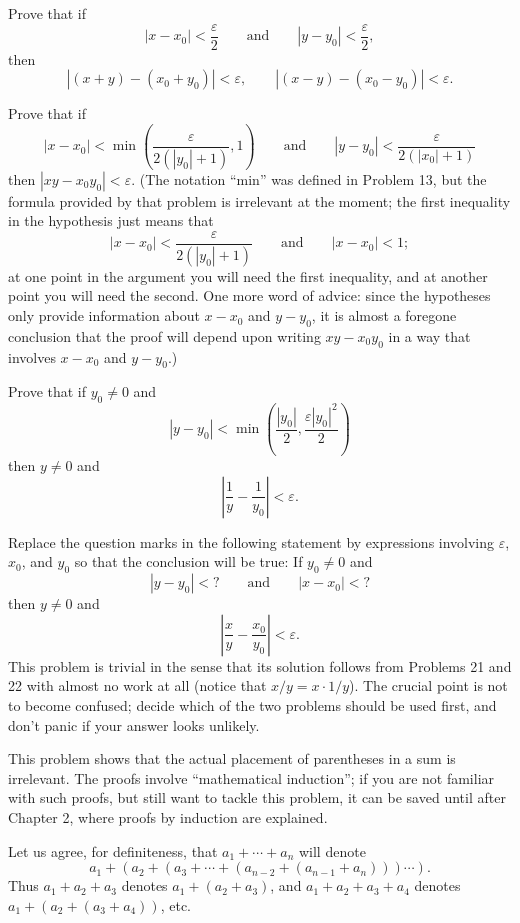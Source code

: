  Prove that if
\[
|x - x_0| < \frac{\varepsilon}{2}
\qquad\text{and}\qquad
|y - y_0| < \frac{\varepsilon}{2},
\]
then
\[
|(x+y) - (x_0+y_0)| < \varepsilon,
\qquad
|(x-y) - (x_0-y_0)| < \varepsilon.
\]

 Prove that if
\[
|x - x_0| < \min\left(\frac{\varepsilon}{2(|y_0|+1)}, 1\right)
\qquad\text{and}\qquad
|y - y_0| < \frac{\varepsilon}{2(|x_0|+1)}
\]
then $|xy - x_0y_0| < \varepsilon$.
(The notation ``min'' was defined in Problem 13, but the formula provided by
that problem is irrelevant at the moment; the first inequality in the
hypothesis just means that
\[
|x - x_0| < \frac{\varepsilon}{2(|y_0|+1)}
\qquad\text{and}\qquad
|x - x_0| < 1;
\]
at one point in the argument you will need the first inequality, and at
another point you will need the second. One more word of advice: since the
hypotheses only provide information about $x - x_0$ and $y - y_0$, it is
almost a foregone conclusion that the proof will depend upon writing
$xy - x_0y_0$ in a way that involves $x - x_0$ and $y - y_0$.)

 Prove that if $y_0 \neq 0$ and
\[
|y - y_0| < \min\left(\frac{|y_0|}{2}, \frac{\varepsilon |y_0|^2}{2}\right)
\]
then $y \neq 0$ and
\[
\left|\frac{1}{y} - \frac{1}{y_0}\right| < \varepsilon.
\]

 Replace the question marks in the following statement by
expressions involving $\varepsilon$, $x_0$, and $y_0$ so that the conclusion
will be true:
If $y_0 \neq 0$ and
\[
|y - y_0| < \text{?} \qquad\text{and}\qquad |x - x_0| < \text{?}
\]
then $y \neq 0$ and
\[
\left|\frac{x}{y} - \frac{x_0}{y_0}\right| < \varepsilon.
\]
This problem is trivial in the sense that its solution follows from Problems
21 and 22 with almost no work at all (notice that $x/y = x \cdot 1/y$). The
crucial point is not to become confused; decide which of the two problems
should be used first, and don't panic if your answer looks unlikely.

 This problem shows that the actual placement of parentheses in a
sum is irrelevant. The proofs involve ``mathematical induction''; if you are
not familiar with such proofs, but still want to tackle this problem, it can
be saved until after Chapter 2, where proofs by induction are explained.

Let us agree, for definiteness, that $a_1 + \cdots + a_n$ will denote
\[
a_1 + (a_2 + (a_3 + \cdots + (a_{n-2} + (a_{n-1} + a_n))) \cdots).
\]
Thus $a_1 + a_2 + a_3$ denotes $a_1 + (a_2 + a_3)$, and $a_1 + a_2 + a_3 + a_4$
denotes $a_1 + (a_2 + (a_3 + a_4))$, etc.

